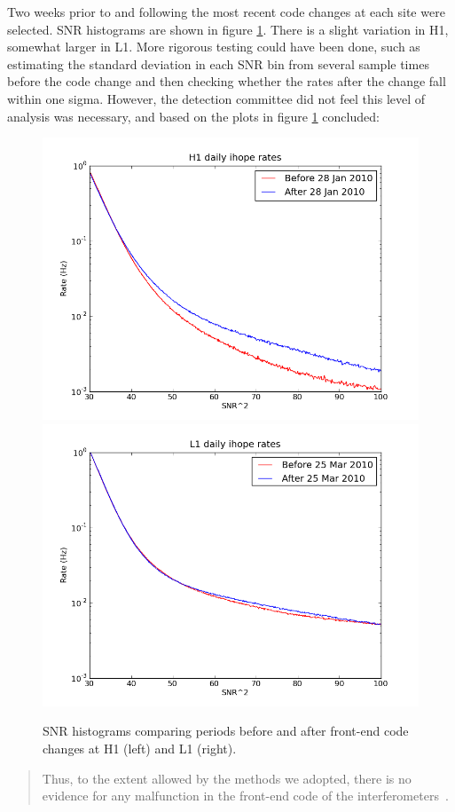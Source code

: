 Two weeks prior to and following the most recent code changes at each
site were selected.  SNR histograms are shown in figure
\ref{f:code_changes}.  There is a slight variation in H1, somewhat
larger in L1.  More rigorous testing could have been done, such as
estimating the standard deviation in each SNR bin from several sample
times before the code change and then checking whether the rates after
the change fall within one sigma.  However, the detection committee
did not feel this level of analysis was necessary, and based on the
plots in figure \ref{f:code_changes} concluded:

\begin{figure}
  \includegraphics[width=0.5\linewidth]{figures/detchar/frontendtest_h1_log_2.png}
  \includegraphics[width=0.5\linewidth]{figures/detchar/frontendtest_l1_log_2.png}
  \caption[SNR histograms before and after code changes.] {
  \label{f:code_changes}
SNR histograms comparing periods before and after 
front-end code changes at H1 (left) and L1 (right).}
\end{figure}%


\begin{quote}
  Thus, to the extent allowed by the methods we adopted, there is no
  evidence for any malfunction in the front-end code of the
  interferometers~\cite{Whitcomb:injection}. 
\end{quote}



